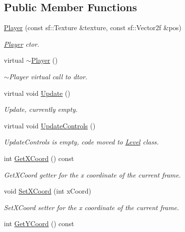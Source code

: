 \subsection*{Public Member Functions}
\begin{DoxyCompactItemize}
\item 
\hyperlink{class_player_a154b6b768b9a1541d29873affd36af85}{Player} (const sf\-::\-Texture \&texture, const sf\-::\-Vector2f \&pos)
\begin{DoxyCompactList}\small\item\em \hyperlink{class_player}{Player} ctor. \end{DoxyCompactList}\item 
virtual \hyperlink{class_player_a749d2c00e1fe0f5c2746f7505a58c062}{$\sim$\-Player} ()
\begin{DoxyCompactList}\small\item\em $\sim$\-Player virtual call to dtor. \end{DoxyCompactList}\item 
virtual void \hyperlink{class_player_a05b60cac1922c5be5c1be16baffa4497}{Update} ()
\begin{DoxyCompactList}\small\item\em Update, currently empty. \end{DoxyCompactList}\item 
virtual void \hyperlink{class_player_aee32aba0a12ace035c1fc0f3acfa31ca}{Update\-Controls} ()
\begin{DoxyCompactList}\small\item\em Update\-Controls is empty, code moved to \hyperlink{class_level}{Level} class. \end{DoxyCompactList}\item 
int \hyperlink{class_player_a63b37d8526ab108d420f59daa8b456ab}{Get\-X\-Coord} () const 
\begin{DoxyCompactList}\small\item\em Get\-X\-Coord getter for the x coordinate of the current frame. \end{DoxyCompactList}\item 
void \hyperlink{class_player_a171909ce2bc5ad4ed7bd1e329818f1cb}{Set\-X\-Coord} (int x\-Coord)
\begin{DoxyCompactList}\small\item\em Set\-X\-Coord setter for the x coordinate of the current frame. \end{DoxyCompactList}\item 
int \hyperlink{class_player_a7ea86222c187ffc350e4948e3d82459e}{Get\-Y\-Coord} () const 

\end{DoxyCompactItemize}
